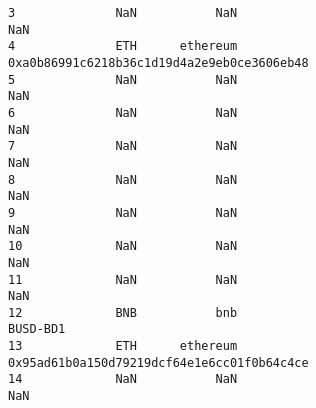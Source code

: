 \documentclass[11pt]{article}
\begin{document}
\begin{tcolorbox}[breakable, size=fbox, boxrule=.5pt, pad at break*=1mm, opacityfill=0]
\begin{Verbatim}[commandchars=\\\{\}]
3              NaN           NaN                                         NaN
4              ETH      ethereum  0xa0b86991c6218b36c1d19d4a2e9eb0ce3606eb48
5              NaN           NaN                                         NaN
6              NaN           NaN                                         NaN
7              NaN           NaN                                         NaN
8              NaN           NaN                                         NaN
9              NaN           NaN                                         NaN
10             NaN           NaN                                         NaN
11             NaN           NaN                                         NaN
12             BNB           bnb                                    BUSD-BD1
13             ETH      ethereum  0x95ad61b0a150d79219dcf64e1e6cc01f0b64c4ce
14             NaN           NaN                                         NaN


\end{Verbatim}
\end{tcolorbox}
\end{document}

